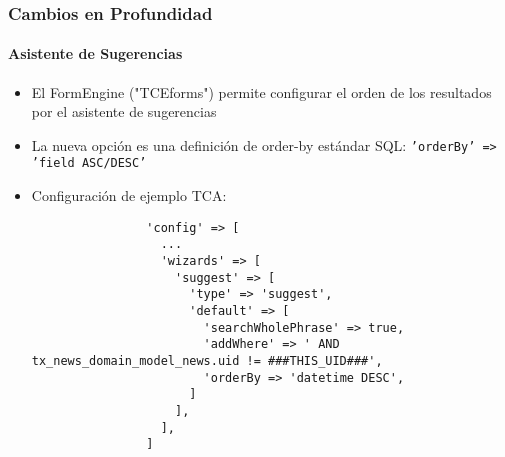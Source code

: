 \begin{frame}[fragile]
	\frametitle{Cambios en Profundidad}
	\framesubtitle{Asistente de Sugerencias}

	\lstset{basicstyle=\tiny\ttfamily}

	\begin{itemize}
		\item El FormEngine ("TCEforms") permite configurar el orden de los resultados por el asistente de sugerencias
		\item La nueva opción es una definición de order-by estándar SQL:\newline
			\small\texttt{'orderBy' => 'field ASC/DESC'}\normalsize
		\item Configuración de ejemplo TCA:

			\begin{lstlisting}
				'config' => [
				  ...
				  'wizards' => [
				    'suggest' => [
				      'type' => 'suggest',
				      'default' => [
				        'searchWholePhrase' => true,
				        'addWhere' => ' AND tx_news_domain_model_news.uid != ###THIS_UID###',
				        'orderBy => 'datetime DESC',
				      ]
				    ],
				  ],
				]
			\end{lstlisting}

	\end{itemize}

\end{frame}











